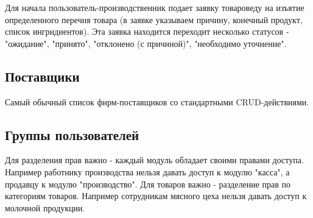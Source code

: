 \documentclass[DIV=calc, paper=a4, fontsize=11pt]{scrartcl} %
\begin{document}
Для начала пользователь-производственник подает заявку товароведу на изъятие определенного перечня товара (в заявке указываем причину, конечный продукт, список ингридиентов). Эта заявка находится переходит несколько статусов - "ожидание", "принято", "отклонено (с причиной)", "необходимо уточнение".

\subsection{Поставщики}

Самый обычный список фирм-поставщиков со стандартными CRUD-действиями.

\subsection{Группы пользователей}

Для разделения прав важно - каждый модуль обладает своими правами доступа. Например работнику производства нельзя давать доступ к модулю "касса", а продавцу к модулю "производство".
Для товаров важно - разделение прав по категориям товаров. Например сотрудникам мясного цеха нельзя давать доступ к молочной продукции.
\end{document}
